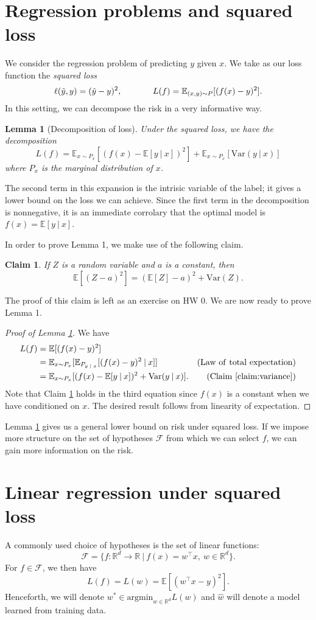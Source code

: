 \documentclass[11pt]{article}
\newcommand\E{\mathbb{E}}
\newcommand\Var{\mathrm{Var}}
\newtheorem{lemma}[theorem]{Lemma}
\newtheorem{claim}[theorem]{Claim}
\begin{document}
\section{Regression problems and squared loss}
We consider the regression problem of predicting $y$ given $x$. We take as our loss function the \textit{squared loss} $$\ell(\hat{y},y) = (\hat{y}-y)^2, \hspace{.5in} L(f) = \E_{(x,y)\sim P}[(f(x)-y)^2].$$ In this setting, we can decompose the risk in a very informative way.
\begin{lemma}[Decomposition of loss] \label{decomp}
Under the squared loss, we have the decomposition $$L(f) = \E_{x\sim P_x} [(f(x)-\E[y \: | \: x])^2] + \E_{x\sim P_x}[\Var(y\: | \:x)]$$ where $P_x$ is the marginal distribution of $x$.
\end{lemma}
The second term in this expansion is the intrisic variable of the label; it gives a lower bound on the loss we can achieve. Since the first term in the decomposition is nonnegative, it is an immediate corrolary that the optimal model is $f(x) = \E[y \: | \: x]$.

In order to prove Lemma 1, we make use of the following claim.
\begin{claim}
  \label{claim:variance}
If $Z$ is a random variable and $a$ is a constant, then $$\E[(Z-a)^2] = (\E[Z]-a)^2 + \Var(Z).$$
\end{claim}
The proof of this claim is left as an exercise on HW 0. We are now ready to prove Lemma 1.
\begin{proof}[Proof of Lemma \ref{decomp}]
We have
\begin{align*}
    L(f) &= \E[(f(x)-y)^2] \\
    &= \E_{x\sim P_x}[\E_{P_{y \; | \;x}}[(f(x)-y)^2\: | \: x]] & \mathrm{(Law~{} of~{} total~{} expectation)} \\
    &= \E_{x\sim P_x}[(f(x)-\E[y \: | \: x])^2 + \Var(y \: | \: x)]. & \mathrm{(Claim~{} \ref{claim:variance})}
\end{align*}
Note that Claim \ref{claim:variance} holds in the third equation since $f(x)$ is a constant when we have conditioned on $x$. The desired result follows from linearity of expectation.
\end{proof}
Lemma \ref{decomp} gives us a general lower bound on risk under squared loss. If we impose more structure on the set of hypotheses $\mathcal{F}$ from which we can select $f$, we can gain more information on the risk.

\section{Linear regression under squared loss}
A commonly used choice of hypotheses is the set of linear functions: $$\mathcal{F} = \{f: \mathbb{R}^d \rightarrow \mathbb{R} \: | \: f(x) = w^\top x, \: w\in \mathbb{R}^d\}.$$ For $f\in\mathcal{F}$, we then have $$L(f) = L(w) = \E[(w^\top x-y)^2].$$ Henceforth, we will denote $w^* \in \mathrm{argmin}_{w\in\mathbb{R}^d} L(w)$ and $\hat{w}$ will denote a model learned from training data.
\end{document}
